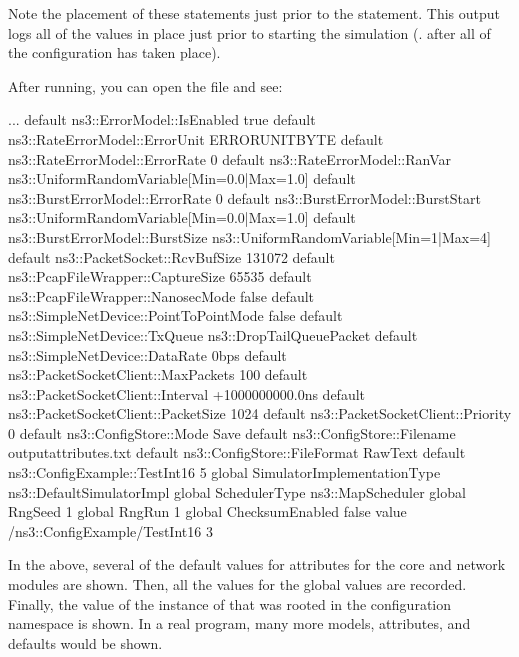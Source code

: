 \documentclass[letterpaper,10pt,english]{sphinxmanual}
\renewcommand{\sphinxcode}[1]{\texttt{\small{#1}}}
\begin{document}
Note the placement of these statements just prior to the
\sphinxcode{} statement.  This output logs all of the
values in place just prior to starting the simulation (. after
all of the configuration has taken place).

After running, you can open the \sphinxcode{} file and see:

\begin{sphinxVerbatim}[commandchars=\\\{\}]
...
default ns3::ErrorModel::IsEnabled \PYGZdq{}true\PYGZdq{}
default ns3::RateErrorModel::ErrorUnit \PYGZdq{}ERROR\PYGZus{}UNIT\PYGZus{}BYTE\PYGZdq{}
default ns3::RateErrorModel::ErrorRate \PYGZdq{}0\PYGZdq{}
default ns3::RateErrorModel::RanVar \PYGZdq{}ns3::UniformRandomVariable[Min=0.0|Max=1.0]\PYGZdq{}
default ns3::BurstErrorModel::ErrorRate \PYGZdq{}0\PYGZdq{}
default ns3::BurstErrorModel::BurstStart \PYGZdq{}ns3::UniformRandomVariable[Min=0.0|Max=1.0]\PYGZdq{}
default ns3::BurstErrorModel::BurstSize \PYGZdq{}ns3::UniformRandomVariable[Min=1|Max=4]\PYGZdq{}
default ns3::PacketSocket::RcvBufSize \PYGZdq{}131072\PYGZdq{}
default ns3::PcapFileWrapper::CaptureSize \PYGZdq{}65535\PYGZdq{}
default ns3::PcapFileWrapper::NanosecMode \PYGZdq{}false\PYGZdq{}
default ns3::SimpleNetDevice::PointToPointMode \PYGZdq{}false\PYGZdq{}
default ns3::SimpleNetDevice::TxQueue \PYGZdq{}ns3::DropTailQueue\PYGZlt{}Packet\PYGZgt{}\PYGZdq{}
default ns3::SimpleNetDevice::DataRate \PYGZdq{}0bps\PYGZdq{}
default ns3::PacketSocketClient::MaxPackets \PYGZdq{}100\PYGZdq{}
default ns3::PacketSocketClient::Interval \PYGZdq{}+1000000000.0ns\PYGZdq{}
default ns3::PacketSocketClient::PacketSize \PYGZdq{}1024\PYGZdq{}
default ns3::PacketSocketClient::Priority \PYGZdq{}0\PYGZdq{}
default ns3::ConfigStore::Mode \PYGZdq{}Save\PYGZdq{}
default ns3::ConfigStore::Filename \PYGZdq{}output\PYGZhy{}attributes.txt\PYGZdq{}
default ns3::ConfigStore::FileFormat \PYGZdq{}RawText\PYGZdq{}
default ns3::ConfigExample::TestInt16 \PYGZdq{}\PYGZhy{}5\PYGZdq{}
global SimulatorImplementationType \PYGZdq{}ns3::DefaultSimulatorImpl\PYGZdq{}
global SchedulerType \PYGZdq{}ns3::MapScheduler\PYGZdq{}
global RngSeed \PYGZdq{}1\PYGZdq{}
global RngRun \PYGZdq{}1\PYGZdq{}
global ChecksumEnabled \PYGZdq{}false\PYGZdq{}
value /\PYGZdl{}ns3::ConfigExample/TestInt16 \PYGZdq{}\PYGZhy{}3\PYGZdq{}
\end{sphinxVerbatim}

In the above, several of the default values for attributes for the core
and network modules are shown.  Then, all the values for the  global values
are recorded.  Finally, the value of the instance of \sphinxcode{}
that was rooted in the configuration namespace is shown.  In a real
 program, many more models, attributes, and defaults would be shown.
\end{document}
